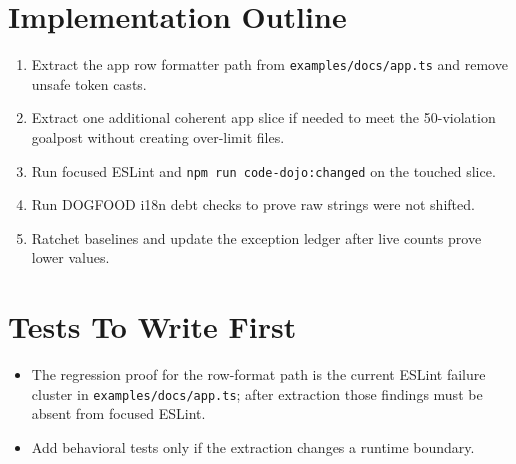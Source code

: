 \section{Implementation Outline}\label{record-198-implementation-outline}

\begin{enumerate}
\def\labelenumi{\arabic{enumi}.}
\tightlist
\item
  Extract the app row formatter path from \texttt{e\allowbreak{}x\allowbreak{}a\allowbreak{}m\allowbreak{}p\allowbreak{}l\allowbreak{}e\allowbreak{}s\allowbreak{}/\allowbreak{}d\allowbreak{}o\allowbreak{}c\allowbreak{}s\allowbreak{}/\allowbreak{}a\allowbreak{}p\allowbreak{}p\allowbreak{}.\allowbreak{}t\allowbreak{}s} and remove unsafe token casts.
\item
  Extract one additional coherent app slice if needed to meet the 50-violation goalpost without creating over-limit files.
\item
  Run focused ESLint and \texttt{n\allowbreak{}p\allowbreak{}m\allowbreak{} \allowbreak{}r\allowbreak{}u\allowbreak{}n\allowbreak{} \allowbreak{}c\allowbreak{}o\allowbreak{}d\allowbreak{}e\allowbreak{}-\allowbreak{}d\allowbreak{}o\allowbreak{}j\allowbreak{}o\allowbreak{}:\allowbreak{}c\allowbreak{}h\allowbreak{}a\allowbreak{}n\allowbreak{}g\allowbreak{}e\allowbreak{}d} on the touched slice.
\item
  Run DOGFOOD i18n debt checks to prove raw strings were not shifted.
\item
  Ratchet baselines and update the exception ledger after live counts prove lower values.
\end{enumerate}

\section{Tests To Write First}\label{record-198-tests-to-write-first}

\begin{itemize}
\tightlist
\item
  The regression proof for the row-format path is the current ESLint failure cluster in \texttt{e\allowbreak{}x\allowbreak{}a\allowbreak{}m\allowbreak{}p\allowbreak{}l\allowbreak{}e\allowbreak{}s\allowbreak{}/\allowbreak{}d\allowbreak{}o\allowbreak{}c\allowbreak{}s\allowbreak{}/\allowbreak{}a\allowbreak{}p\allowbreak{}p\allowbreak{}.\allowbreak{}t\allowbreak{}s}; after extraction those findings must be absent from focused ESLint.
\item
  Add behavioral tests only if the extraction changes a runtime boundary.
\end{itemize}


